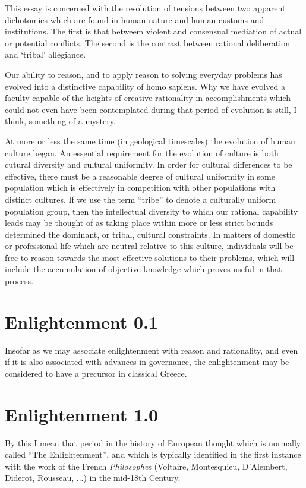 \documentclass[10pt,titlepage]{article}
\begin{document}
This essay is concerned with the resolution of tensions between two apparent dichotomies which are found in human nature and human customs and institutions.
The first is that betweem violent and consensual mediation of actual or potential conflicts.
The second is the contrast between rational deliberation and `tribal' allegiance.

Our ability to reason, and to apply reason to solving everyday problems has evolved into a distinctive capability of homo sapiens.
Why we have evolved a faculty capable of the heights of creative rationality in accomplishments which could not even have been contemplated during that period of evolution is still, I think, something of a mystery.

At more or less the same time (in geological timescales) the evolution of human culture began.
An essential requirement for the evolution of culture is both cutural diversity and cultural uniformity.
In order for cultural differences to be effective, there must be a reasonable degree of cultural uniformity in some population which is effectively in competition with other populations with distinct cultures.
If we use the term ``tribe'' to denote a culturally uniform population group, then the intellectual diversity to which our rational capability leads may be thought of as taking place within more or less strict bounds determined the dominant, or tribal, cultural constraints.
In matters of domestic or professional life which are neutral relative to this culture, individuals will be free to reason towards the most effective solutions to their problems, which will include the accumulation of objective knowledge which proves useful in that process.





\section{Enlightenment 0.1}

Insofar as we may associate enlightenment with reason and rationality, and even if it is also associated with advances in governance, the enlightenment may be considered to have a precursor in classical Greece.

\section{Enlightenment 1.0}

By this I mean that period in the history of European thought which is normally called ``The Enlightenment'', and which is typically identified in the first instance with the work of the French \emph{Philosophe}s (Voltaire, Montesquieu, D'Alembert, Diderot, Rousseau, ...) in the mid-18th Century.
\end{document}

